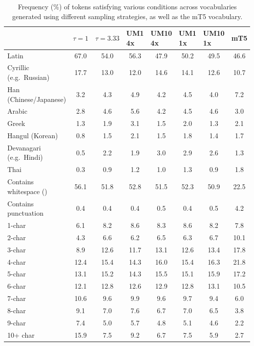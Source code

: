 \documentclass{article} %
\begin{document}
\begin{table}[]
\caption{Frequency (\%) of tokens satisfying various conditions across vocabularies generated using different sampling strategies, as well as the mT5 vocabulary.}
\label{tab:vocab_analysis}
\centering
\footnotesize
\begin{tabular}{lccccccc}
\toprule
 &
  \multicolumn{1}{l}{$\tau = 1$} &
  \multicolumn{1}{l}{$\tau = 3.33$} &
  \multicolumn{1}{l}{UM1 4x} &
  \multicolumn{1}{l}{UM10 4x} &
  \multicolumn{1}{l}{UM1 1x} &
  \multicolumn{1}{l}{UM10 1x} &
  \multicolumn{1}{l}{mT5} \\
  \midrule
Latin                   & 67.0 & 54.0 & 56.3 & 47.9 & 50.2 & 49.5 & 46.6 \\
Cyrillic (e.g.~Russian) & 17.7 & 13.0 & 12.0 & 14.6 & 14.1 & 12.6 & 10.7 \\
Han (Chinese/Japanese)  & 3.2  & 4.3  & 4.9  & 4.2 & 4.5  & 4.0  & 7.2  \\
Arabic                  & 2.8  & 4.6  & 5.6  & 4.2 & 4.5  & 4.6  & 3.0  \\
Greek                   & 1.3  & 1.9  & 3.1  & 1.5 & 2.0  & 1.3  & 2.1  \\
Hangul (Korean)         & 0.8  & 1.5  & 2.1  & 1.5 & 1.8  & 1.4  & 1.7  \\
Devanagari (e.g.~Hindi) & 0.5  & 2.2  & 1.9  & 3.0 & 2.9  & 2.6  & 1.3  \\
Thai                    & 0.3  & 0.9  & 1.2  & 1.0 & 1.3  & 0.9  & 1.8  \\
\midrule
Contains whitespace (\underline{\hspace{0.7em}}) & 56.1 & 51.8 & 52.8 & 51.5 & 52.3 & 50.9 & 22.5 \\
Contains punctuation    & 0.4  & 0.4  & 0.4  & 0.5 & 0.4  & 0.5  & 4.2  \\
\midrule
1-char   & 6.1  & 8.2  & 8.6  & 8.3 & 8.6  & 8.2  & 7.8  \\
2-char   & 4.3  & 6.6  & 6.2  & 6.5 & 6.3  & 6.7  & 10.1 \\
3-char   & 8.9  & 12.6 & 11.7 & 13.1 & 12.6 & 13.4 & 17.8 \\
4-char   & 12.4 & 15.4 & 14.3 & 16.0 & 15.4 & 16.3 & 21.8 \\
5-char   & 13.1 & 15.2 & 14.3 & 15.5 & 15.1 & 15.9 & 17.2 \\
6-char   & 12.1 & 12.8 & 12.6 & 12.9 & 12.8 & 13.1 & 10.5 \\
7-char   & 10.6 & 9.6  & 9.9  & 9.6 & 9.7  & 9.4  & 6.0  \\
8-char   & 9.1  & 7.0  & 7.6  & 6.7 & 7.0  & 6.5  & 3.8  \\
9-char   & 7.4  & 5.0  & 5.7  & 4.8 & 5.1  & 4.6  & 2.2  \\
10+ char & 15.9 & 7.5  & 9.2  & 6.7 & 7.5  & 5.9  & 2.7  \\
\bottomrule
\end{tabular}
\end{table}
\end{document}
